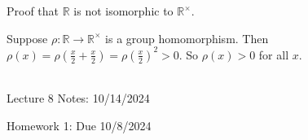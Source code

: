 \documentclass{book}
\newcommand{\hOne}{%
   \color{Black}%
   \fontsize{14}{16}\selectfont%
}
\newcommand{\exOne}{%
   \color{Purple}%
   \fontsize{13}{15}\selectfont%
}
\newcommand{\exTwoP}{%
   \color{RedViolet}%
   \fontsize{13}{15}\selectfont%
}
\newenvironment{myIndent}{%
   \begin{adjustwidth}{2.5em}{0em}%
}{%
   \end{adjustwidth}%
}
\newcommand{\mySepTwo}[1][.]{%
   {\noindent\color{#1}{\rule{6.5in}{0.5mm}}}\\%
}
\newcommand{\retTwo}{\hfill\bigbreak}
\newcommand{\mHeader}[1]{{
   \color{Black}%
   \fontsize{20}{18}\selectfont%
   #1\retTwo
}}
\begin{document}
\exOne
Proof that $\mathbb{R}$ is not isomorphic to $\mathbb{R}^\times$.
\begin{myIndent}\exTwoP
	Suppose $\rho: \mathbb{R} \longrightarrow \mathbb{R}^\times$ is a group homomorphism. Then\\ $\rho(x) = \rho(\frac{x}{2} + \frac{x}{2}) = \rho(\frac{x}{2})^2 > 0$. So $\rho(x) > 0$ for all $x$.\retTwo
\end{myIndent}

\hOne
\mySepTwo

\mHeader{Lecture 8 Notes: 10/14/2024}






\newpage

\phantom{a} %

\newpage

\hOne
\mHeader{Homework 1: Due 10/8/2024}
\end{document}
